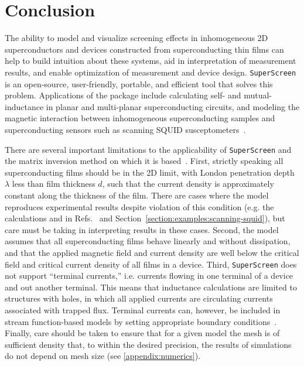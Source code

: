 \documentclass[final,3p,times,twocolumn]{elsarticle}
\newcommand{\inline}[1]{\texttt{#1}\xspace}
\newcommand{\SuperScreen}{\inline{SuperScreen}}
\begin{document}

\section{Conclusion}
\label{section:conlusion}

The ability to model and visualize screening effects in inhomogeneous 2D superconductors and devices constructed from superconducting thin films can help to build intuition about these systems, aid in interpretation of measurement results, and enable optimization of measurement and device design. \SuperScreen is an open-source, user-friendly, portable, and efficient tool that solves this problem. Applications of the package include calculating self- and mutual-inductance in planar and multi-planar superconducting circuits, and modeling the magnetic interaction between inhomogeneous superconducting samples and superconducting sensors such as scanning SQUID susceptometers~\cite{Kirtley2016-zz}.

There are several important limitations to the applicability of \SuperScreen and the matrix inversion method on which it is based~\cite{Brandt2004-ew,Brandt2005-wj}. First, strictly speaking all superconducting films should be in the 2D limit, with London penetration depth $\lambda$ less than film thickness $d$, such that the current density is approximately constant along the thickness of the film. There are cases where the model reproduces experimental results despite violation of this condition (e.g. the calculations and in Refs.~\cite{Kirtley2016-zz,Kirtley2016-gt} and Section~\ref{section:examples:scanning-squid}), but care must be taking in interpreting results in these cases. Second, the model assumes that all superconducting films behave linearly and without dissipation, and that the applied magnetic field and current density are well below the critical field and critical current density of all films in a device. Third, \SuperScreen does not support ``terminal currents,'' i.e. currents flowing in one terminal of a device and out another terminal. This means that inductance calculations are limited to structures with holes, in which all applied currents are circulating currents associated with trapped flux. Terminal currents can, however, be included in stream function-based models by setting appropriate boundary conditions~\cite{Khapaev1997-kw,Khapaev2001-xq,Khapaev2001-pw,Muller2021-ci}. Finally, care should be taken to ensure that for a given model the mesh is of sufficient density that, to within the desired precision, the results of simulations do not depend on mesh size (see \ref{appendix:numerics}).
\end{document}
